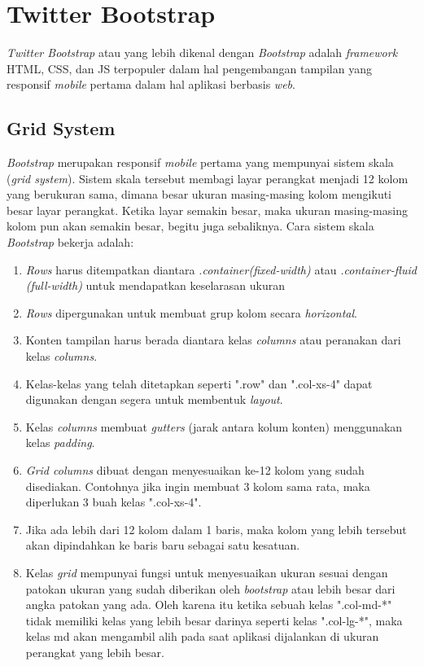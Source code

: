 \section{Twitter Bootstrap}
\label{sec: Bootrstrap}

\textit{Twitter Bootstrap}\cite{bootstrap} atau yang lebih dikenal dengan \textit{Bootstrap} adalah \textit{framework} HTML, CSS, dan JS terpopuler dalam hal pengembangan tampilan yang responsif \textit{mobile} pertama dalam hal aplikasi berbasis \textit{web}. 

\subsection{Grid System}
\label{sub: gridSystem}

\textit{Bootstrap} merupakan responsif \textit{mobile} pertama yang mempunyai sistem skala (\textit{grid system}). Sistem skala tersebut membagi layar perangkat menjadi 12 kolom yang berukuran sama, dimana besar ukuran masing-masing kolom mengikuti besar layar perangkat. Ketika layar semakin besar, maka ukuran masing-masing kolom pun akan semakin besar, begitu juga sebaliknya. Cara sistem skala \textit{Bootstrap} bekerja adalah:

\begin{enumerate}
	\item \textit{Rows} harus ditempatkan diantara \textit{.container(fixed-width)} atau \textit{.container-fluid (full-width)} untuk mendapatkan keselarasan ukuran
	\item \textit{Rows} dipergunakan untuk membuat grup kolom secara \textit{horizontal}.
	\item Konten tampilan harus berada diantara kelas \textit{columns} atau peranakan dari kelas \textit{columns}.
	\item Kelas-kelas yang telah ditetapkan seperti ".row" dan ".col-xs-4" dapat digunakan dengan segera untuk membentuk \textit{layout}.
	\item Kelas \textit{columns} membuat \textit{gutters} (jarak antara kolum konten) menggunakan kelas \textit{padding}.
	\item \textit{Grid columns} dibuat dengan menyesuaikan ke-12 kolom yang sudah disediakan. Contohnya jika ingin membuat 3 kolom sama rata, maka diperlukan 3 buah kelas ".col-xs-4".
	\item Jika ada lebih dari 12 kolom dalam 1 baris, maka kolom yang lebih tersebut akan dipindahkan ke baris baru sebagai satu kesatuan.
	\item Kelas \textit{grid} mempunyai fungsi untuk menyesuaikan ukuran sesuai dengan patokan ukuran yang sudah diberikan oleh \textit{bootstrap} atau lebih besar dari angka patokan yang ada. Oleh karena itu ketika sebuah kelas ".col-md-*" tidak memiliki kelas yang lebih besar darinya seperti kelas ".col-lg-*", maka kelas md akan mengambil alih pada saat aplikasi dijalankan di ukuran perangkat yang lebih besar. 
\end{enumerate}
	
